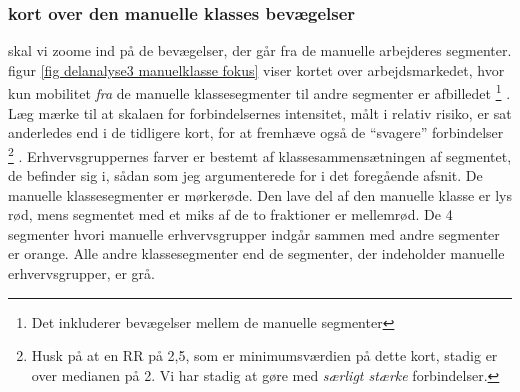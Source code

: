 %
\subsubsection{kort over den manuelle klasses bevægelser}
%

































skal vi zoome ind på de bevægelser, der går fra de manuelle arbejderes segmenter. figur \ref{fig delanalyse3 manuelklasse fokus} viser kortet over arbejdsmarkedet, hvor kun mobilitet \emph{fra} de manuelle klassesegmenter til andre segmenter er afbilledet%
%
    \footnote{ Det inkluderer bevægelser mellem de manuelle segmenter}%
%
. Læg mærke til at skalaen for forbindelsernes intensitet, målt i relativ risiko, er sat anderledes end i de tidligere kort, for at fremhæve også de “svagere” forbindelser%
%
    \footnote{ Husk på at en RR på 2,5, som er minimumsværdien på dette kort, stadig er over medianen på 2. Vi har stadig at gøre med \emph{særligt stærke} forbindelser.}%
%
. Erhvervsgruppernes farver er bestemt af klassesammensætningen af segmentet, de befinder sig i, sådan som jeg argumenterede for i det foregående afsnit. De manuelle klassesegmenter er mørkerøde. Den lave del af den manuelle klasse er lys rød, mens segmentet med et miks af de to fraktioner er mellemrød. De 4 segmenter hvori manuelle erhvervsgrupper indgår sammen med andre segmenter er orange. Alle andre klassesegmenter end de segmenter, der indeholder manuelle erhvervsgrupper, er grå. 

